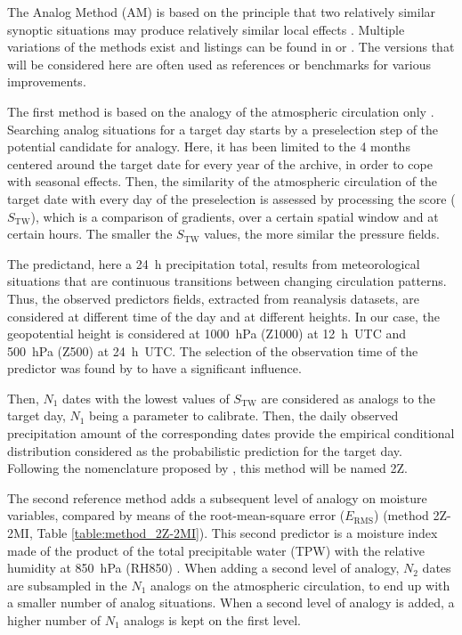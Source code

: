 \documentclass[hess, manuscript]{copernicus}
\begin{document}
\introduction  %
\label{sec:introduction}

The Analog Method (AM) is based on the principle that two relatively similar synoptic situations may produce relatively similar local effects \citep{Lorenz1956, Lorenz1969}. Multiple variations of the methods exist and listings can be found in \citet{Horton2016} or \citet{BenDaoud2015}. The versions that will be considered here are often used as references or benchmarks for various improvements.

The first method is based on the analogy of the atmospheric circulation only \citep[Table \ref{table:method_2Z},][]{Obled2002, Bontron2005, Marty2012}. Searching analog situations for a target day starts by a preselection step of the potential candidate for analogy. Here, it has been limited to the 4 months centered around the target date for every year of the archive, in order to cope with seasonal effects. Then, the similarity of the atmospheric circulation of the target date with every day of the preselection is assessed by processing the \citet{Teweles1954} score ($S_{\text{TW}}$), which is a comparison of gradients, over a certain spatial window and at certain hours. The smaller the $S_{\text{TW}}$ values, the more similar the pressure fields.

The predictand, here a 24~h precipitation total, results from meteorological situations that are continuous transitions between changing circulation patterns. Thus, the observed predictors fields, extracted from reanalysis datasets, are considered at different time of the day and at different heights. In our case, the geopotential height is considered at 1000~hPa (Z1000) at 12~h~UTC and 500~hPa (Z500) at 24~h~UTC. The selection of the observation time of the predictor was found by \citet{Bontron2004} to have a significant influence.

Then, $N_{1}$ dates with the lowest values of $S_{\text{TW}}$ are considered as analogs to the target day, $N_{1}$ being a parameter to calibrate. Then, the daily observed precipitation amount of the corresponding dates provide the empirical conditional distribution considered as the probabilistic prediction for the target day. Following the nomenclature proposed by \citet{Horton2016}, this method will be named 2Z.

The second reference method adds a subsequent level of analogy on moisture variables, compared by means of the root-mean-square error ($E_{\text{RMS}}$) (method 2Z-2MI, Table \ref{table:method_2Z-2MI}). This second predictor is a moisture index made of the product of the total precipitable water (TPW) with the relative humidity at 850~hPa (RH850) \citep{Bontron2004}. When adding a second level of analogy, $N_{2}$ dates are subsampled in the $N_{1}$ analogs on the atmospheric circulation, to end up with a smaller number of analog situations. When a second level of analogy is added, a higher number of $N_{1}$ analogs is kept on the first level.
\end{document}
